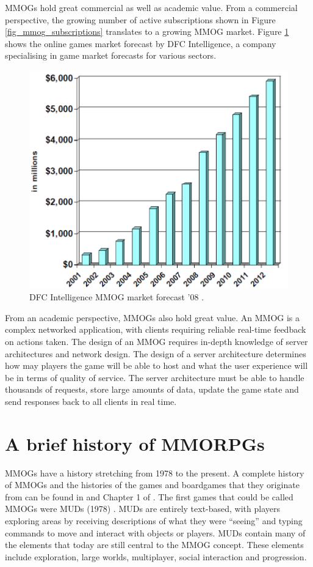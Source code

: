 \documentclass[journal,oneside,a4paper,onecolumn]{IEEEtran}
\begin{document}
\acp{MMOG} hold great commercial as well as academic value. From a commercial perspective, the growing number of active subscriptions shown in Figure \ref{fig_mmog_subscriptions} translates to a growing \ac{MMOG} market. Figure \ref{fig_mmog_market} shows the online games market forecast by DFC Intelligence, a company specialising in game market forecasts for various sectors.
%
\begin{figure}[htbp]
 \centering
 \includegraphics[width=0.5\columnwidth]{DFC_MMOG_market}
 \caption{DFC Intelligence MMOG market forecast '08 \cite{Fan_phd}.}
 \label{fig_mmog_market}
\end{figure}

From an academic perspective, \acp{MMOG} also hold great value. An MMOG is a complex networked application, with clients requiring reliable real-time feedback on actions taken. The design of an MMOG requires in-depth knowledge of server architectures and network design. The design of a server architecture determines how may players the game will be able to host and what the user experience will be in terms of quality of service. The server architecture must be able to handle thousands of requests, store large amounts of data, update the game state and send responses back to all clients in real time.

\section{A brief history of MMORPGs}

\acp{MMOG} have a history stretching from 1978 to the present. A complete history of \acp{MMOG} and the histories of the games and boardgames that they originate from can be found in \cite{mmog_past_present_future} and Chapter 1 of \cite{designing_virtual_worlds}. The first games that could be called \acp{MMOG} were \acp{MUD} (1978) \cite{mud_intro}. \acp{MUD} are entirely text-based, with players exploring areas by receiving descriptions of what they were ``seeing'' and typing commands to move and interact with objects or players. \acp{MUD} contain many of the elements that today are still central to the \ac{MMOG} concept. These elements include exploration, large worlds, multiplayer, social interaction and progression.
\end{document}
